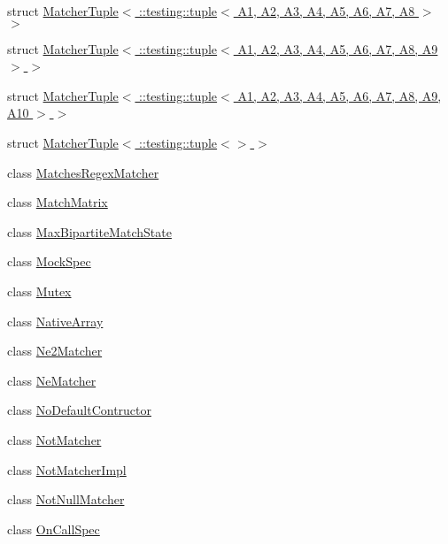 \begin{DoxyCompactItemize}
struct \hyperlink{structtesting_1_1internal_1_1_matcher_tuple_3_01_1_1testing_1_1tuple_3_01_a1_00_01_a2_00_01_a3_0d8930d50f28e62c202d0bf6b34d01eac}{Matcher\+Tuple$<$ \+::testing\+::tuple$<$ A1, A2, A3, A4, A5, A6, A7, A8 $>$ $>$}
\item 
struct \hyperlink{structtesting_1_1internal_1_1_matcher_tuple_3_01_1_1testing_1_1tuple_3_01_a1_00_01_a2_00_01_a3_05ce0d9708ffc0cc1f9fec180f9f8202e}{Matcher\+Tuple$<$ \+::testing\+::tuple$<$ A1, A2, A3, A4, A5, A6, A7, A8, A9 $>$ $>$}
\item 
struct \hyperlink{structtesting_1_1internal_1_1_matcher_tuple_3_01_1_1testing_1_1tuple_3_01_a1_00_01_a2_00_01_a3_0842d32b3c1d00aa4e42fe38fbc4fa689}{Matcher\+Tuple$<$ \+::testing\+::tuple$<$ A1, A2, A3, A4, A5, A6, A7, A8, A9, A10 $>$ $>$}
\item 
struct \hyperlink{structtesting_1_1internal_1_1_matcher_tuple_3_01_1_1testing_1_1tuple_3_4_01_4}{Matcher\+Tuple$<$ \+::testing\+::tuple$<$$>$ $>$}
\item 
class \hyperlink{classtesting_1_1internal_1_1_matches_regex_matcher}{Matches\+Regex\+Matcher}
\item 
class \hyperlink{classtesting_1_1internal_1_1_match_matrix}{Match\+Matrix}
\item 
class \hyperlink{classtesting_1_1internal_1_1_max_bipartite_match_state}{Max\+Bipartite\+Match\+State}
\item 
class \hyperlink{classtesting_1_1internal_1_1_mock_spec}{Mock\+Spec}
\item 
class \hyperlink{classtesting_1_1internal_1_1_mutex}{Mutex}
\item 
class \hyperlink{classtesting_1_1internal_1_1_native_array}{Native\+Array}
\item 
class \hyperlink{classtesting_1_1internal_1_1_ne2_matcher}{Ne2\+Matcher}
\item 
class \hyperlink{classtesting_1_1internal_1_1_ne_matcher}{Ne\+Matcher}
\item 
class \hyperlink{classtesting_1_1internal_1_1_no_default_contructor}{No\+Default\+Contructor}
\item 
class \hyperlink{classtesting_1_1internal_1_1_not_matcher}{Not\+Matcher}
\item 
class \hyperlink{classtesting_1_1internal_1_1_not_matcher_impl}{Not\+Matcher\+Impl}
\item 
class \hyperlink{classtesting_1_1internal_1_1_not_null_matcher}{Not\+Null\+Matcher}
\item 
class \hyperlink{classtesting_1_1internal_1_1_on_call_spec}{On\+Call\+Spec}

\end{DoxyCompactItemize}
